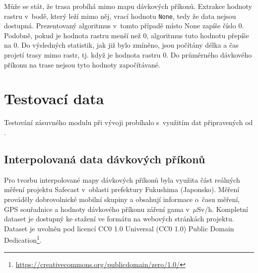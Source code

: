 		\begin{algorithm}
		\begin{algorithmic} [1] 

			    \ELSE
{}
			\ENDIF
			
			\ENDIF {} 
		\ENDFOR
		
		  
	\end{algorithmic}
\end{algorithm}

Může se stát, že trasa probíhá mimo mapu dávkových příkonů. Extrakce
hodnoty rastru v~bodě, který leží mimo něj, vrací hodnotu
\texttt{None}, tedy že data nejsou dostupná. Prezentovaný algoritmus
v~tomto případě místo None zapíše číslo 0. Podobně, pokud je hodnota
rastru menší než 0, algoritmus tuto hodnotu přepíše na 0. Do
výsledných statistik, jak již bylo zmíněno, jsou počítány délka a čas
projetí trasy mimo rastr, tj. když je hodnota rastru 0. Do průměrného
dávkového příkonu na trase nejsou tyto hodnoty započítávané.

\clearpage

\section{Testovací data} Testování zásuvného modulu při vývoji
probíhalo s~využitím dat připravených od .

\subsection{Interpolovaná data dávkových příkonů} Pro tvorbu
interpolované mapy dávkových příkonů byla využita část reálných měření
projektu Safecast v~oblasti prefektury Fukushima (Japonsko). Měření
prováděly dobrovolnické mobilní skupiny a obsahují informace o~času
měření, GPS souřadnice a hodnoty dávkového příkonu záření gama
v~$\mu$Sv/h. Kompletní dataset je dostupný ke stažení ve formátu
 na webových stránkách projektu. Dataset je uvolněn pod
licencí CC0 1.0 Universal (CC0 1.0) Public Domain
Dedication\footnote{\url{https://creativecommons.org/publicdomain/zero/1.0/}}.

